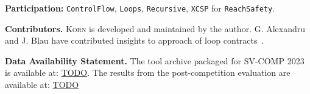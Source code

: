 \documentclass{llncs}
\newcommand{\Korn}{\textsc{Korn}\xspace}
\begin{document}
\noindent \textbf{Participation:}
\texttt{ControlFlow},
\texttt{Loops},
\texttt{Recursive},
\texttt{XCSP} for  \texttt{ReachSafety}.

% 
% 
% 
% 
% 
% 
% 
% 
% 
% 
% 

% 

\smallskip

\noindent\textbf{Contributors.}
\Korn is developed and maintained by the author.
G. Alexandru~\cite{alexandru2019} and J. Blau have contributed
insights to approach of loop contracts~\cite{ernst:vmcai2022}.

\smallskip

\textbf{Data Availability Statement.}
The tool archive packaged for SV-COMP 2023 is available at:
\url{TODO}.
The results from the post-competition evaluation are available at:
\url{TODO}



\end{document}
